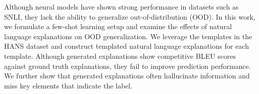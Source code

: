 Although neural models have shown strong performance in datasets such as SNLI, they lack the ability to generalize out-of-distribution (OOD). In this work, we formulate a few-shot learning setup and examine the effects of natural language explanations on OOD generalization. We leverage the templates in the HANS dataset and construct templated natural language explanations for each template. Although generated explanations show competitive BLEU scores against ground truth explanations, they fail to improve prediction performance. We further show that generated explanations often hallucinate information and miss key elements that indicate the label.
